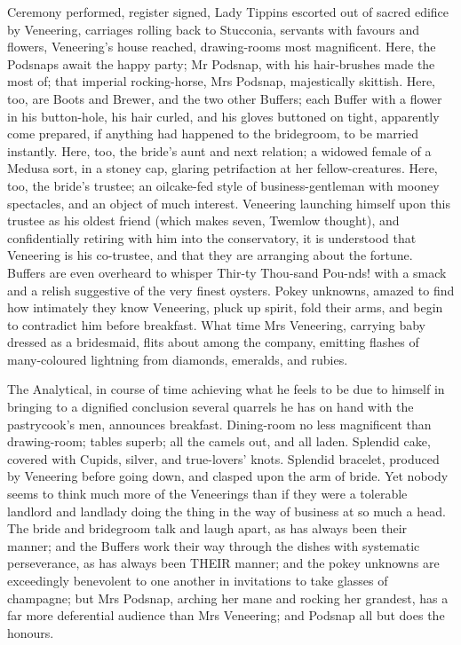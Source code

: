 Ceremony performed, register signed, Lady Tippins escorted out of sacred
edifice by Veneering, carriages rolling back to Stucconia, servants
with favours and flowers, Veneering’s house reached, drawing-rooms most
magnificent. Here, the Podsnaps await the happy party; Mr Podsnap, with
his hair-brushes made the most of; that imperial rocking-horse, Mrs
Podsnap, majestically skittish. Here, too, are Boots and Brewer, and
the two other Buffers; each Buffer with a flower in his button-hole, his
hair curled, and his gloves buttoned on tight, apparently come prepared,
if anything had happened to the bridegroom, to be married instantly.
Here, too, the bride’s aunt and next relation; a widowed female of
a Medusa sort, in a stoney cap, glaring petrifaction at her
fellow-creatures. Here, too, the bride’s trustee; an oilcake-fed style
of business-gentleman with mooney spectacles, and an object of much
interest. Veneering launching himself upon this trustee as his oldest
friend (which makes seven, Twemlow thought), and confidentially retiring
with him into the conservatory, it is understood that Veneering is his
co-trustee, and that they are arranging about the fortune. Buffers are
even overheard to whisper Thir-ty Thou-sand Pou-nds! with a smack and a
relish suggestive of the very finest oysters. Pokey unknowns, amazed
to find how intimately they know Veneering, pluck up spirit, fold
their arms, and begin to contradict him before breakfast. What time Mrs
Veneering, carrying baby dressed as a bridesmaid, flits about among
the company, emitting flashes of many-coloured lightning from diamonds,
emeralds, and rubies.

The Analytical, in course of time achieving what he feels to be due to
himself in bringing to a dignified conclusion several quarrels he has on
hand with the pastrycook’s men, announces breakfast. Dining-room no less
magnificent than drawing-room; tables superb; all the camels out, and
all laden. Splendid cake, covered with Cupids, silver, and true-lovers’
knots. Splendid bracelet, produced by Veneering before going down, and
clasped upon the arm of bride. Yet nobody seems to think much more of
the Veneerings than if they were a tolerable landlord and landlady
doing the thing in the way of business at so much a head. The bride and
bridegroom talk and laugh apart, as has always been their manner;
and the Buffers work their way through the dishes with systematic
perseverance, as has always been THEIR manner; and the pokey unknowns
are exceedingly benevolent to one another in invitations to take
glasses of champagne; but Mrs Podsnap, arching her mane and rocking her
grandest, has a far more deferential audience than Mrs Veneering; and
Podsnap all but does the honours.

